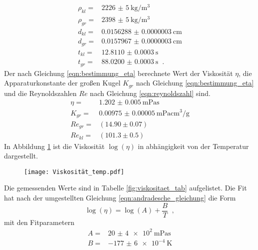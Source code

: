 \begin{align*}
  \rho_{kl}=&\SI[per-mode=fraction]{2226(5)}{\kilo\gram\per\meter^3}\\
  \rho_{gr}=&\SI[per-mode=fraction]{2398(5)}{\kilo\gram\per\meter^{3}}\\
  d_{kl}=&\SI[per-mode=fraction]{0.0156288(3)}{\centi\meter}\\
  d_{gr}=&\SI[per-mode=fraction]{0.0157967(3)}{\centi\meter}\\
  t_{kl}=&\SI[per-mode=fraction]{12.8110(3)}{\second}\\
  t_{gr}=&\SI[per-mode=fraction]{88.0200(3)}{\second}\;\;.
\end{align*}
Der nach Gleichung \eqref{eqn:bestimmung_eta} berechnete Wert der Viskosität $\eta$, die Apparaturkonstante der
großen Kugel $K_{gr}$ nach Gleichung \eqref{eqn:bestimmung_eta} und die Reynoldszahlen $Re$ nach Gleichung
\eqref{eqn:reynoldszahl} sind.
\begin{align*}
  \eta=&\SI{1.202(5)}{\meter\pascal\second}\\
  K_{gr}=&\SI[per-mode=fraction]{0.00975(5)}{\meter\pascal\centi\meter^3\per\gram}\\
  Re_{gr}=&(14.90\pm0.07)\\
  Re_{kl}=&(101.3\pm0.5)
  \label{eqn:etaKRE}
\end{align*}
In Abbildung \ref{fig:Viskositaet} ist die Viskosität $\log(\eta)$
in abhängigkeit von der Temperatur dargestellt.
\begin{figure}
  \centering
  \texttt{[image: Viskosität\_temp.pdf]}
  \caption{}
  \label{fig:Viskositaet}
\end{figure}
Die gemessenden Werte sind in Tabelle \ref{fig:viskositaet_tab} aufgelistet. Die Fit hat
nach der umgestellten Gleichung \eqref{eqn:andradesche_gleichung} die Form
\begin{equation}
  \log(\eta)=\log(A)+\frac{B}{T}\;\;,
\end{equation}
mit den Fitparametern
\begin{align*}
  A=&\SI{20(4)e2}{\meter\pascal\second}\\
  B=&\SI[per-mode=fraction]{-177(6)e-4}{\kelvin}
\end{align*}
